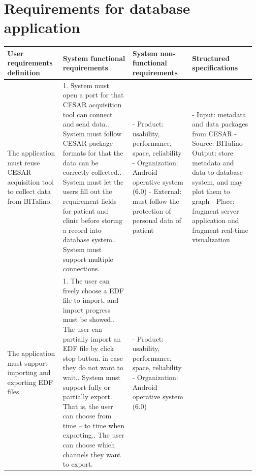 \section{Requirements for database application}
\begin{table}
\begin{adjustwidth}{-1.2cm}{}
\begin{tabular}{ |p{2.4cm}|p{5.6cm}|p{3.2cm}|p{4.3cm}|}
 \hline
 User requirements definition& System functional requirements& System non-functional requirements& Structured specifications\\
 \hline
 The application must reuse CESAR acquisition tool to collect data from BITalino.&
 1. System must open a port for that CESAR acquisition tool can connect and send data.\newline
 2. System must follow CESAR package formats for that the data can be correctly collected.\newline
 3. System must let the users fill out the requirement fields for patient and clinic before storing a record into database system.\newline
 4. System must support multiple connections.&
 - Product: usability, performance, space, reliability\newline
 - Organization: Android operative system (6.0)\newline
 - External: must follow the protection of personal data of patient&
 - Input: metadata and data packages from CESAR\newline
 - Source: BITalino\newline
 - Output: store metadata and data to database system, and may plot them to graph\newline
 - Place: fragment server application and fragment real-time visualization\\
 \hline
 The application must support importing and exporting EDF files.&
 1. The user can freely choose a EDF file to import, and import progress must be showed.\newline
 2. The user can partially import an EDF file by click stop button, in case they do not want to wait.\newline
 3. System must support fully or partially export. That is, the user can choose from time – to time when exporting.\newline
 4. The user can choose which channels they want to export.&
 - Product: usability, performance, space, reliability\newline
 - Organization: Android operative system (6.0)\newline

\end{tabular}
\end{adjustwidth}
\end{table}
